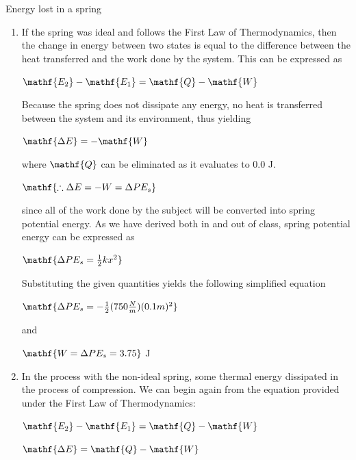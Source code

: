 \documentclass{homework}
\begin{document}
\question Energy lost in a spring
\begin{enumerate}[label={(\alph*)}]
    \item 
    If the spring was ideal and follows the First Law of Thermodynamics, then the change in energy between two states is equal to the difference between the heat transferred and the work done by the system. This can be expressed as 
    \begin{center}$\mathf{E_2} - \mathf{E_1} = \mathf{Q} - \mathf{W}$
    \end{center}
    Because the spring does not dissipate any energy, no heat is transferred between the system and its environment, thus yielding
    \begin{center}$\mathf{\Delta E} = - \mathf{W}$
    \end{center}
    \begin{center}
        where $\mathf{Q}$ can be eliminated as it evaluates to 0.0 J.
    \end{center}
    \begin{center}
        $\mathf{\therefore \Delta E = - W = \Delta PE_s}$
    \end{center}
    since all of the work done by the subject will be converted into spring potential energy. As we have derived both in and out of class, spring potential energy can be expressed as 
    \begin{center}
        $\mathf{\Delta PE_s = \frac{1}{2}kx^2}$
    \end{center}
    Substituting the given quantities yields the following simplified equation
    \begin{center}
        $\mathf{\Delta PE_s = -\frac{1}{2}(750\frac{N}{m})(0.1 m)^2}$ 
    \end{center}
    \begin{center}
        and
    \end{center}
     \begin{center}
        $\mathf{W = \Delta PE_s = 3.75}$ J 
    \end{center}
    \item 
    In the process with the non-ideal spring, some thermal energy dissipated in the process of compression. We can begin again from the equation provided under the First Law of Thermodynamics:
    \begin{center}$\mathf{E_2} - \mathf{E_1} = \mathf{Q} - \mathf{W}$
    \end{center}
     \begin{center}$\mathf{\Delta E} = \mathf{Q} - \mathf{W}$

\end{center}
\end{enumerate}
\end{document}
